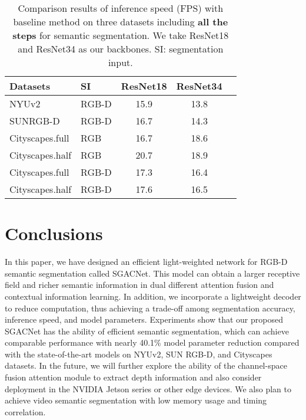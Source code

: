 \documentclass[journal,twoside,web]{ieeecolor}
\begin{document}
\begin{table}[!t]\centering
	\renewcommand{\arraystretch}{1.08}\caption{Comparison results of inference speed (FPS) with baseline method on three datasets including \textbf{all the steps} for semantic segmentation. We take ResNet18 and ResNet34 as our backbones. SI: segmentation input.}
	\footnotesize
	\begin{tabular}{llccc}
		\toprule \textbf{Datasets} & \textbf{SI}     &\textbf{ResNet18}   & \textbf{ResNet34}            \\
		\midrule
		NYUv2 		& RGB-D & 15.9 & 13.8 \\ 
		SUNRGB-D 	& RGB-D & 16.7 & 14.3 \\ 
		Cityscapes.full 	& RGB   & 16.7 & 18.6 \\
		Cityscapes.half 	& RGB   & 20.7 & 18.9 \\ 
		Cityscapes.full     & RGB-D & 17.3 & 16.4  \\
		Cityscapes.half     & RGB-D & 17.6 & 16.5  \\ 
		\bottomrule
	\end{tabular}\label{tab:TIME}\end{table}



\section{Conclusions}\label{sec:Conclusions}
In this paper, we have designed an efficient light-weighted network for RGB-D semantic segmentation called SGACNet. This model can obtain a larger receptive field and richer semantic information in dual different attention fusion and contextual information learning. In addition, we incorporate a lightweight decoder to reduce computation, thus achieving a trade-off among segmentation accuracy, inference speed, and model parameters. Experiments show that our proposed SGACNet has the ability of efficient semantic segmentation, which can achieve comparable performance with nearly 40.1\% model parameter reduction compared with the state-of-the-art models on NYUv2, SUN RGB-D, and Cityscapes datasets. In the future, we will further explore the ability of the channel-space fusion attention module to extract depth information and also consider deployment in the NVIDIA Jetson series or other edge devices. We also plan to achieve video semantic segmentation with low memory usage and timing correlation.



\end{document}

